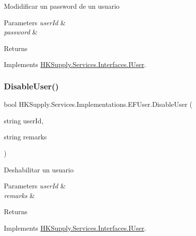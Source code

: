 Modidificar un password de un usuario 


\begin{DoxyParams}{Parameters}
{\em user\+Id} & \\
\hline
{\em password} & \\
\hline
\end{DoxyParams}
\begin{DoxyReturn}{Returns}

\end{DoxyReturn}


Implements \mbox{\hyperlink{interface_h_k_supply_1_1_services_1_1_interfaces_1_1_i_user}{H\+K\+Supply.\+Services.\+Interfaces.\+I\+User}}.

\mbox{\label{class_h_k_supply_1_1_services_1_1_implementations_1_1_e_f_user_acb2996bf9f333684786d3e2d7b702ba4}} 
\subsubsection{\texorpdfstring{Disable\+User()}{DisableUser()}}
{\footnotesize\ttfamily bool H\+K\+Supply.\+Services.\+Implementations.\+E\+F\+User.\+Disable\+User (\begin{DoxyParamCaption}\item[{string}]{user\+Id,  }\item[{string}]{remarks }\end{DoxyParamCaption})}



Deshabilitar un usuario 


\begin{DoxyParams}{Parameters}
{\em user\+Id} & \\
\hline
{\em remarks} & \\
\hline
\end{DoxyParams}
\begin{DoxyReturn}{Returns}

\end{DoxyReturn}


Implements \mbox{\hyperlink{interface_h_k_supply_1_1_services_1_1_interfaces_1_1_i_user}{H\+K\+Supply.\+Services.\+Interfaces.\+I\+User}}.

